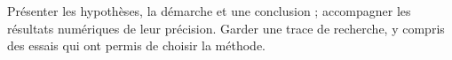 \vspace{5mm}\noindent Présenter les hypothèses, la démarche et une conclusion ; accompagner les résultats numériques de leur précision. Garder une trace de recherche, y compris des essais qui ont permis de choisir la méthode.\par\vfill{}\par\vspace{2mm}\noindent{}
\clearpage\endgroup